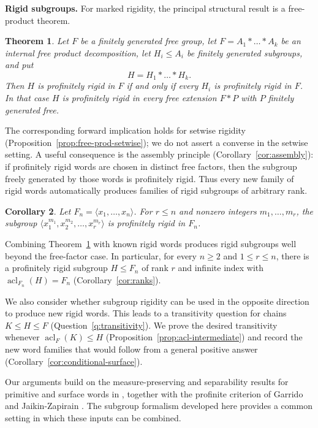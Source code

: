\documentclass[11pt]{amsart}
\theoremstyle{plain}
\newtheorem{theorem}{Theorem}[section]
\newtheorem{corollary}[theorem]{Corollary}
\theoremstyle{definition}
\newcommand{\acl}{\operatorname{acl}}
\begin{document}
\medskip\noindent\textbf{Rigid subgroups.}
For marked rigidity, the principal structural result is a free-product theorem.
\begin{theorem}\label{thm:free-prod}
Let $F$ be a finitely generated free group, let $F=A_1*\dots*A_k$ be an internal
free product decomposition, let $H_i\le A_i$ be finitely generated subgroups, and
put
\[
  H=H_1*\dots*H_k .
\]
Then $H$ is profinitely rigid in $F$ \emph{if and only if} every $H_i$ is
profinitely rigid in $F$. In that case $H$ is profinitely rigid in every free
extension $F*P$ with $P$ finitely generated free.
\end{theorem}
The corresponding forward implication holds for setwise rigidity
(Proposition~\ref{prop:free-prod-setwise}); we do not assert a converse in the
setwise setting.  A useful consequence is the assembly principle
(Corollary~\ref{cor:assembly}): if profinitely rigid words are chosen in distinct
free factors, then the subgroup freely generated by those words is profinitely
rigid.  Thus every new family of rigid words automatically produces families of
rigid subgroups of arbitrary rank.
\begin{corollary}\label{cor:powers}
Let $F_n=\langle x_1,\dots,x_n\rangle$. For $r\le n$ and nonzero integers
$m_1,\dots,m_r$, the subgroup
$\langle x_1^{m_1},x_2^{m_2},\dots,x_r^{m_r}\rangle$ is profinitely rigid in
$F_n$.
\end{corollary}
Combining Theorem~\ref{thm:free-prod} with known rigid words produces rigid
subgroups well beyond the free-factor case. In particular, for every $n\ge2$
and $1\le r\le n$, there is a profinitely rigid subgroup $H\le F_n$ of rank
$r$ and infinite index with $\acl_{F_n}(H)=F_n$
(Corollary~\ref{cor:ranks}).

We also consider whether subgroup rigidity can be used in the opposite
direction to produce new rigid words. This leads to a transitivity question
for chains $K\le H\le F$ (Question~\ref{q:transitivity}). We prove the desired
transitivity whenever $\acl_F(K)\le H$ (Proposition~\ref{prop:acl-intermediate})
and record the new word families that would follow from a general positive
answer (Corollary~\ref{cor:conditional-surface}).

Our arguments build on the measure-preserving and separability results for
primitive and surface words in \cite{PP,Wilton,Wilton2,AF,HMP}, together with
the profinite criterion of Garrido and Jaikin-Zapirain \cite{GJ}. The subgroup
formalism developed here provides a common setting in which these inputs can be
combined.
\end{document}

